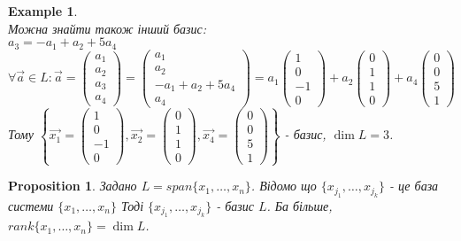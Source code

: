 \documentclass[a4paper, 10pt]{article}
\theoremstyle{theoremdd}
\theoremstyle{theoremdd}
\theoremstyle{theoremdd}
\theoremstyle{theoremdd}
\newtheorem{example}[theorem]{Example}
\theoremstyle{theoremdd}
\newtheorem{proposition}[theorem]{Proposition}
\theoremstyle{theoremdd}
\theoremstyle{theoremdd}
\theoremstyle{theoremdd}
\begin{document}
\begin{example}
	\bigskip \\
	Можна знайти також інший базис:\\
	$a_3 = -a_1 + a_2 + 5a_4$\\
	$\forall \vec{a} \in L: \vec{a} = \begin{pmatrix} a_1 \\ a_2 \\ a_3 \\ a_4 \end{pmatrix} = \begin{pmatrix} a_1 \\ a_2 \\ -a_1 + a_2 + 5a_4 \\ a_4 \end{pmatrix} = a_1 \begin{pmatrix} 1 \\ 0 \\ -1 \\ 0 \end{pmatrix} + a_2 \begin{pmatrix} 0 \\ 1 \\ 1 \\ 0 \end{pmatrix} + a_4 \begin{pmatrix} 0 \\ 0 \\ 5 \\ 1 \end{pmatrix}$\\
	Тому $\left\{\vec{x_1} = \begin{pmatrix} 1 \\ 0 \\ -1 \\ 0\end{pmatrix}, \vec{x_2} = \begin{pmatrix} 0 \\ 1 \\ 1 \\ 0\end{pmatrix}, \vec{x_4} = \begin{pmatrix} 0 \\ 0 \\ 5 \\ 1\end{pmatrix} \right\}$ - базис, $\dim{L} = 3$.
	\end{example}
		
	\begin{proposition}
	Задано $L = span\{x_1,\dots,x_n\}$. Відомо що $\{x_{j_1},\dots,x_{j_k}\}$ - це база системи $\{x_1,\dots,x_n\}$ Тоді $\{x_{j_1},\dots,x_{j_k}\}$ - базис $L$. Ба більше, $rank\{x_1,\dots,x_n\} = \dim L$.
	\end{proposition}
	
\end{document}
